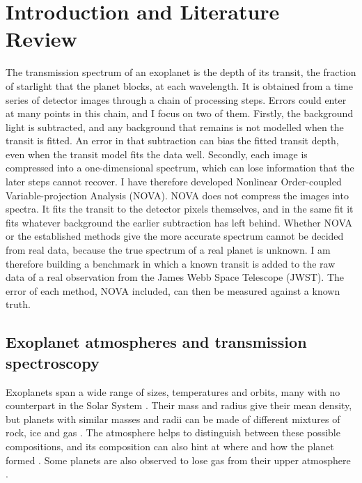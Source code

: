 \section{Introduction and Literature Review}
\label{sec:introduction}

The transmission spectrum of an exoplanet is the depth of its transit, the
fraction of starlight that the planet blocks, at each wavelength. It is
obtained from a time series of detector images through a chain of processing
steps. Errors could enter at many points in this chain, and I focus on two of them. Firstly, the background light is subtracted, and any background that remains is not modelled when the transit is fitted. An error in that subtraction can bias the fitted transit depth, even when the transit model fits the data well. Secondly, each image is compressed into a one-dimensional spectrum, which can lose
information that the later steps cannot recover. I have therefore developed
Nonlinear Order-coupled Variable-projection Analysis (NOVA). NOVA does not
compress the images into spectra. It fits the transit to the detector pixels
themselves, and in the same fit it fits whatever background the earlier
subtraction has left behind. Whether NOVA or the established methods give the
more accurate spectrum cannot be decided from real data, because the true
spectrum of a real planet is unknown. I am therefore building a benchmark in
which a known transit is added to the raw data of a real observation from the
James Webb Space Telescope (JWST). The error of each method, NOVA included, can then be measured against a known truth.

\subsection{Exoplanet atmospheres and transmission spectroscopy}
\label{sec:atmospheres-transmission}

Exoplanets span a wide range of sizes, temperatures and orbits, many with no
counterpart in the Solar System \citep{WinnFabrycky2015}. Their mass and
radius give their mean density, but planets with similar masses and radii can
be made of different mixtures of rock, ice and gas \citep{RogersSeager2010}.
The atmosphere helps to distinguish between these possible compositions, and its composition can also hint at where and how the planet formed \citep{Madhusudhan2019}. Some planets are also observed to lose gas from their upper atmosphere \citep{VidalMadjarEtAl2003}.

